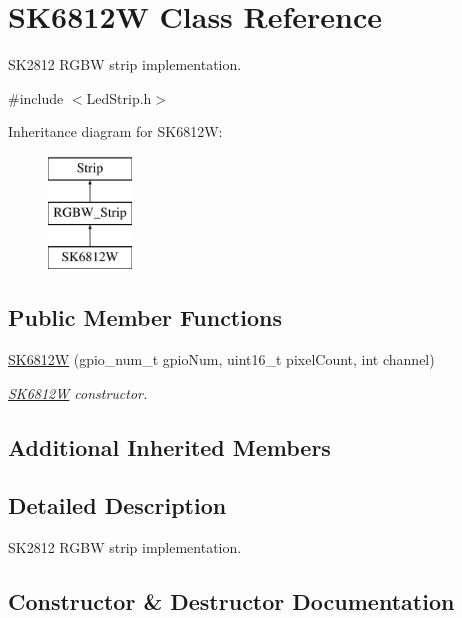 \hypertarget{classSK6812W}{}\section{S\+K6812W Class Reference}
\label{classSK6812W}


S\+K2812 R\+G\+BW strip implementation.  




{\ttfamily \#include $<$Led\+Strip.\+h$>$}

Inheritance diagram for S\+K6812W\+:\begin{figure}[H]
\begin{center}
\leavevmode
\includegraphics[height=3.000000cm]{classSK6812W}
\end{center}
\end{figure}
\subsection*{Public Member Functions}
\begin{DoxyCompactItemize}
\item 
\mbox{\hyperlink{classSK6812W_a054ab55007348545fcfe524eca4740a6}{S\+K6812W}} (gpio\+\_\+num\+\_\+t gpio\+Num, uint16\+\_\+t pixel\+Count, int channel)
\begin{DoxyCompactList}\small\item\em \mbox{\hyperlink{classSK6812W}{S\+K6812W}} constructor. \end{DoxyCompactList}\end{DoxyCompactItemize}
\subsection*{Additional Inherited Members}


\subsection{Detailed Description}
S\+K2812 R\+G\+BW strip implementation. 

\subsection{Constructor \& Destructor Documentation}
\mbox{\label{classSK6812W_a054ab55007348545fcfe524eca4740a6}} 
